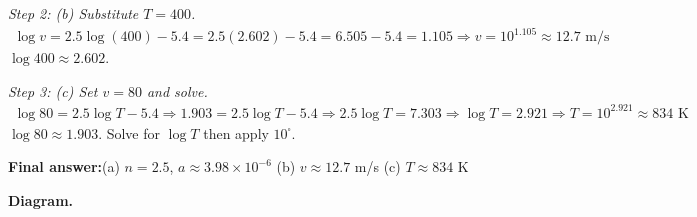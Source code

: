 \documentclass[11pt]{article}
\begin{document}
\textit{Step 2: (b) Substitute \( T = 400 \).}
\[\begin{gathered}
\log v = 2.5\log(400) - 5.4 = 2.5(2.602) - 5.4 = 6.505 - 5.4 = 1.105 \Rightarrow v = 10^{1.105} \approx 12.7 \text{ m/s}
\end{gathered}\]
\( \log 400 \approx 2.602 \).

\textit{Step 3: (c) Set \( v = 80 \) and solve.}
\[\begin{gathered}
\log 80 = 2.5\log T - 5.4 \Rightarrow 1.903 = 2.5\log T - 5.4 \Rightarrow 2.5\log T = 7.303 \Rightarrow \log T = 2.921 \Rightarrow T = 10^{2.921} \approx 834 \text{ K}
\end{gathered}\]
\( \log 80 \approx 1.903 \). Solve for \( \log T \) then apply \( 10^{\square} \).

\begin{answerbox}
\textbf{Final answer:}\quad (a) \(\displaystyle  n = 2.5 \), \(\displaystyle  a \approx 3.98 \times 10^{-6} \) \quad  (b) \(\displaystyle  v \approx 12.7 \) m/s \quad  (c) \(\displaystyle  T \approx 834 \) K
\end{answerbox}
\textbf{Diagram.}
\end{document}
